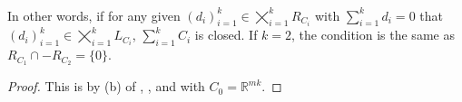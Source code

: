 \paragraph{}In other words, if for any given $(d_i)_{i=1}^k\in\bigtimes_{i=1}^kR_{C_i}$ with $\sum_{i=1}^kd_i=0$ that $(d_i)_{i=1}^k\in\bigtimes_{i=1}^kL_{C_i}$, $\sum_{i=1}^kC_i$ is closed. If $k=2$, the condition is the same as $R_{C_1}\cap -R_{C_2}=\{0\}$.

\begin{proof}
	This is by (b) of , , and  with $C_0=\mathbb{R}^{mk}$.
\end{proof}
